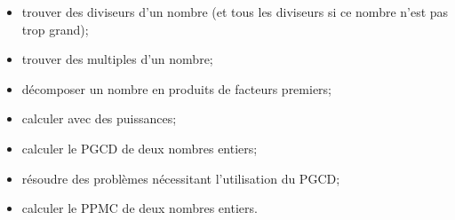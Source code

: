 \begin{acquis} %
\begin{itemize}
\item trouver des diviseurs d'un nombre (et tous les diviseurs si ce nombre n'est pas trop grand);
\item trouver des multiples d'un nombre; 
\item décomposer un nombre en produits de facteurs premiers;
\item calculer avec des puissances;
\item calculer le PGCD de deux nombres entiers;
\item résoudre des problèmes nécessitant l'utilisation du PGCD;
\item calculer le PPMC de deux nombres entiers.
\end{itemize}
\end{acquis}


